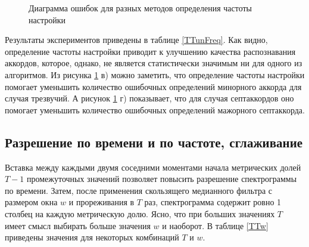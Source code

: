 \begin{figure}[h]
  \begin{minipage}[h]{0.49\linewidth}
  \end{minipage}
  \hfill
  \begin{minipage}[h]{0.49\linewidth}
  \end{minipage}
  \hfill
  \begin{minipage}[h]{0.49\linewidth}
  \end{minipage}
  \hfill
  \begin{minipage}[h]{0.49\linewidth}
  \end{minipage}
  \caption{Диаграмма ошибок для разных методов определения частоты настройки}
  \label{img:tuning}
\end{figure}

Результаты экспериментов приведены в таблице \ref{TTunFreq}. Как видно,
определение частоты настройки приводит к улучшению качества распознавания
аккордов, которое, однако, не является статистически значимым ни для одного из
алгоритмов. Из рисунка \ref{img:tuning} в) можно заметить, что определение
частоты настройки помогает уменьшить количество ошибочных определений минорного
аккорда для случая трезвучий. А рисунок \ref{img:tuning} г) показывает, что для
случая септаккордов оно помогает уменьшить количество ошибочных определений
мажорного септаккорда.

\subsection{Разрешение по времени и по частоте, сглаживание} \label{ssect3_Tw}

Вставка между каждыми двумя соседними моментами начала метрических долей
$T-1$ промежуточных значений позволяет повысить разрешение спектрограммы по
времени. Затем, после применения скользящего медианного фильтра с размером окна
$w$ и прореживания в $T$ раз, спектрограмма содержит ровно 1 столбец на каждую
метрическую долю. Ясно, что при больших значениях $T$ имеет смысл выбирать
больше значения $w$ и наоборот. В таблице \ref{TTw} приведены значения для
некоторых комбинаций $T$ и $w$.

